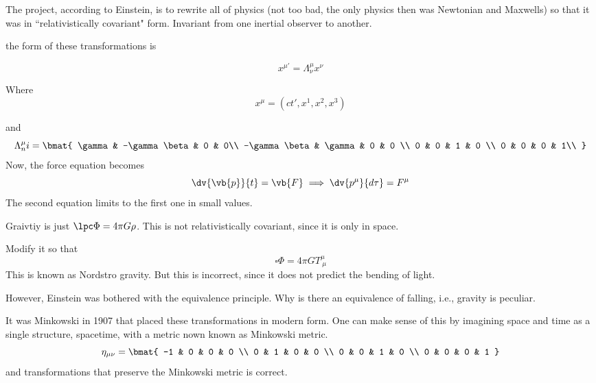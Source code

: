		The project, according to Einstein, is to rewrite all of physics (not too bad, the only physics then was Newtonian and Maxwells)
		so that it was in ``relativistically covariant" form. Invariant from one inertial observer to another.

		the form of these transformations is

		\begin{equation}
			x^{\mu'} = \Lambda^\mu_\nu x^\nu
		\end{equation}
		
		Where
		\begin{equation}
			x^\mu = (ct', x^1, x^2, x^3)
		\end{equation}

		and
		\begin{equation}
			\Lambda^\mu_ni = \bmat{
				\gamma & -\gamma \beta & 0 & 0\\
				-\gamma \beta & \gamma & 0 & 0 \\
				0 & 0 & 1 & 0 \\
				0 & 0 & 0 & 1\\
			}
		\end{equation}
		Now, the force equation becomes
		\begin{equation}
			\dv{\vb{p}}{t} = \vb{F}\implies \dv{p^\mu}{d\tau} = F^\mu
		\end{equation}
		The second equation limits to the first one in small values.


		Graivtiy is just $\lpc \Phi = 4\pi G \rho$. This is not relativistically covariant, since it is only in space.

		Modify it so that
		\begin{equation}
			\square \Phi = 4\pi G T^\mu_{\ \mu}
		\end{equation}
		This is known as Nordstro gravity. But this is incorrect, since it does not
		predict the bending of light.

		However, Einstein was bothered with the equivalence principle. Why is there
		an equivalence of falling, i.e., gravity is peculiar.

		It was Minkowski in 1907 that placed these transformations in modern form.
		One can make sense of this by imagining space and time as a single structure, spacetime, with
		a metric nown known as Minkowski metric.
		\begin{equation}
			\eta_{\mu\nu} = \bmat{
				-1 & 0 & 0 & 0 \\
				0 & 1 & 0 & 0 \\
				0 & 0 & 1 & 0 \\
				0 & 0 & 0 & 1
			}
		\end{equation}
		and transformations that preserve the Minkowski metric is correct.

